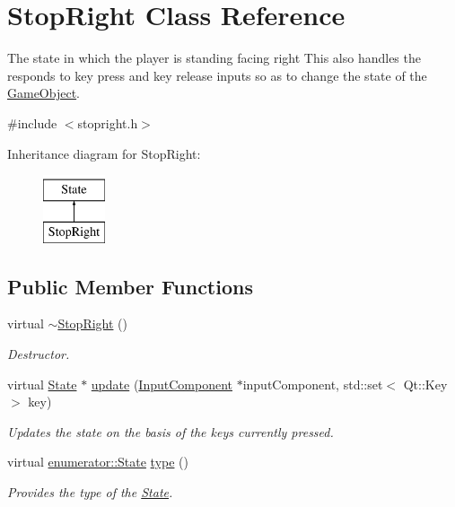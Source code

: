 \hypertarget{classStopRight}{\section{Stop\-Right Class Reference}
\label{classStopRight}
}


The state in which the player is standing facing right This also handles the responds to key press and key release inputs so as to change the state of the \hyperlink{classGameObject}{Game\-Object}.  




{\ttfamily \#include $<$stopright.\-h$>$}

Inheritance diagram for Stop\-Right\-:\begin{figure}[H]
\begin{center}
\leavevmode
\includegraphics[height=2.000000cm]{classStopRight}
\end{center}
\end{figure}
\subsection*{Public Member Functions}
\begin{DoxyCompactItemize}
\item 
\hypertarget{classStopRight_a545fb26595a15ade51344e4ec7837aaf}{virtual \hyperlink{classStopRight_a545fb26595a15ade51344e4ec7837aaf}{$\sim$\-Stop\-Right} ()}\label{classStopRight_a545fb26595a15ade51344e4ec7837aaf}

\begin{DoxyCompactList}\small\item\em Destructor. \end{DoxyCompactList}\item 
virtual \hyperlink{classState}{State} $\ast$ \hyperlink{classStopRight_a40403908f1cf3ac8ca809c550fea3783}{update} (\hyperlink{classInputComponent}{Input\-Component} $\ast$input\-Component, std\-::set$<$ Qt\-::\-Key $>$ key)
\begin{DoxyCompactList}\small\item\em Updates the state on the basis of the keys currently pressed. \end{DoxyCompactList}\item 
virtual \hyperlink{namespaceenumerator_a5fc7b342c2c633e1037b07cea237a222}{enumerator\-::\-State} \hyperlink{classStopRight_a5d5dabb814633abfb33d114806be282a}{type} ()
\begin{DoxyCompactList}\small\item\em Provides the type of the \hyperlink{classState}{State}. \end{DoxyCompactList}\end{DoxyCompactItemize}


